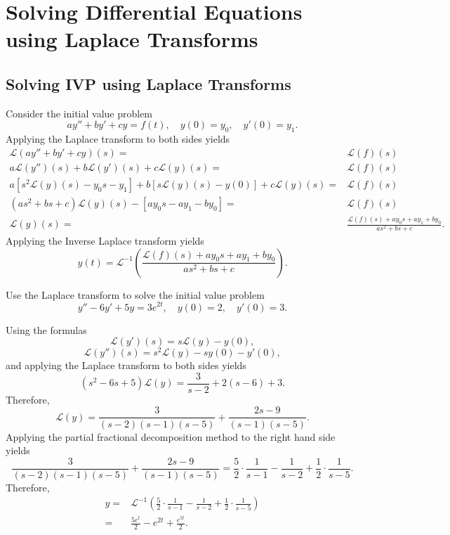 \chapter{Solving Differential Equations using Laplace Transforms}

\section{Solving IVP using Laplace Transforms}

Consider the initial value problem
\[ay''+by'+cy=f(t), \quad y(0)=y_0,\quad y'(0)=y_1.\]
Applying the Laplace transform to both sides yields
\[
\begin{aligned}
\mathcal{L}(ay''+by'+cy)(s)=&\mathcal{L}(f)(s)\\
a\mathcal{L}(y'')(s)+b\mathcal{L}(y')(s)+c\mathcal{L}(y)(s)=&\mathcal{L}(f)(s)\\
a[s^2\mathcal{L}(y)(s)-y_0s-y_1]+b[s\mathcal{L}(y)(s)-y(0)]+c\mathcal{L}(y)(s)=&\mathcal{L}(f)(s)\\
(as^2+bs+c)\mathcal{L}(y)(s)-[ay_0s-ay_1-by_0]=&\mathcal{L}(f)(s)\\
\mathcal{L}(y)(s)=&\frac{\mathcal{L}(f)(s)+ay_0s+ay_1+by_0}{as^2+bs+c}.
\end{aligned}
\]
Applying the Inverse Laplace transform yields
\[y(t)=\mathcal{L}^{-1}\left(\frac{\mathcal{L}(f)(s)+ay_0s+ay_1+by_0}{as^2+bs+c}\right).\]

\begin{example}
  Use the Laplace transform to solve the initial value problem
  \[y''-6y'+5y=3e^{2t},\quad y(0)=2, \quad y'(0)=3.\]
\end{example}
\begin{solution}
  Using the formulas
  \[\mathcal{L}(y')(s)=s\mathcal{L}(y)-y(0),\]
  \[\mathcal{L}(y'')(s)=s^2\mathcal{L}(y)-sy(0)-y'(0),\]
and applying the Laplace transform to both sides yields
\[(s^2-6s+5)\mathcal{L}(y)=\frac{3}{s-2}+2(s-6)+3.\]
Therefore,
\[\mathcal{L}(y)=\frac{3}{(s-2)(s-1)(s-5)}+\frac{2s-9}{(s-1)(s-5)}.\]
Applying the partial fractional decomposition method to the right hand side yields
\[\frac{3}{(s-2)(s-1)(s-5)}+\frac{2s-9}{(s-1)(s-5)}=\frac{5}{2}\cdot\frac{1}{s-1}-\frac{1}{s-2}+\frac{1}{2}\cdot\frac{1}{s-5}.\]
Therefore,
\[
\begin{aligned}
  y=&\mathcal{L}^{-1}\left(\frac{5}{2}\cdot\frac{1}{s-1}-\frac{1}{s-2}+\frac{1}{2}\cdot\frac{1}{s-5}\right)\\
  =&\frac{5e^t}{2}-e^{2t}+\frac{e^{5t}}{2}.
\end{aligned}  
\]
\end{solution}

